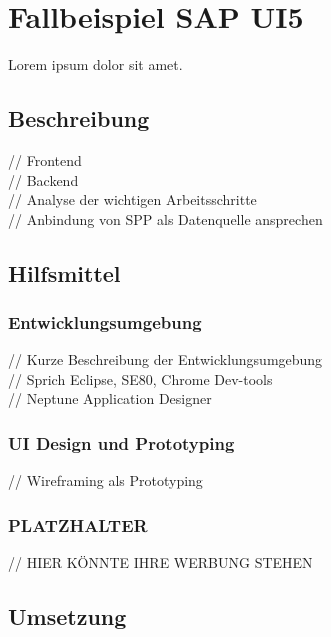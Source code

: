 \documentclass[12pt,a4paper,bibliography=totocnumbered,listof=totocnumbered]{scrartcl}
\begin{document}
\section{Fallbeispiel SAP UI5}
Lorem ipsum dolor sit amet.

\subsection{Beschreibung}
// Frontend\\
// Backend\\
// Analyse der wichtigen Arbeitsschritte\\
// Anbindung von \ac{SPP} als Datenquelle ansprechen\\

\subsection{Hilfsmittel}
\subsubsection{Entwicklungsumgebung}
// Kurze Beschreibung der Entwicklungsumgebung\\
// Sprich Eclipse, SE80, Chrome Dev-tools\\
// Neptune Application Designer\\

\subsubsection{UI Design und Prototyping}
// Wireframing als Prototyping\\

\subsubsection{PLATZHALTER}
// HIER KÖNNTE IHRE WERBUNG STEHEN \cite{NilsBlog2014}\\

\subsection{Umsetzung}
\end{document}
